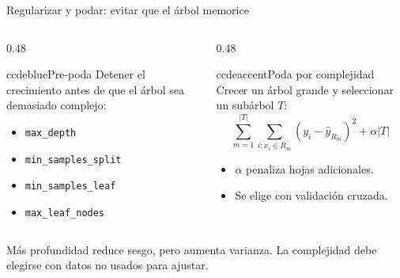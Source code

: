 \documentclass[aspectratio=169,11pt,table]{beamer}
\begin{document}
\begin{frame}{Regularizar y podar: evitar que el árbol memorice}
\footnotesize
\begin{columns}[T,onlytextwidth]
\begin{column}{0.48\textwidth}
\begin{contrastbox}{ccdeblue}{Pre-poda}
\footnotesize
Detener el crecimiento antes de que el árbol sea demasiado complejo:
\begin{itemize}
  \item \texttt{max\_depth}
  \item \texttt{min\_samples\_split}
  \item \texttt{min\_samples\_leaf}
  \item \texttt{max\_leaf\_nodes}
\end{itemize}
\end{contrastbox}
\end{column}
\begin{column}{0.48\textwidth}
\begin{contrastbox}{ccdeaccent}{Poda por complejidad}
\footnotesize
Crecer un árbol grande y seleccionar un subárbol \(T\):
\[
\sum_{m=1}^{|T|}\sum_{i:x_i\in R_m}(y_i-\hat y_{R_m})^2+\alpha|T|
\]
\begin{itemize}
  \item \(\alpha\) penaliza hojas adicionales.
  \item Se elige con validación cruzada.
\end{itemize}
\end{contrastbox}
\end{column}
\end{columns}
\vspace{0cm}
\begin{keybox}
\centering
Más profundidad reduce sesgo, pero aumenta varianza. La complejidad debe elegirse con datos no usados para ajustar.
\end{keybox}
\end{frame}
\end{document}
